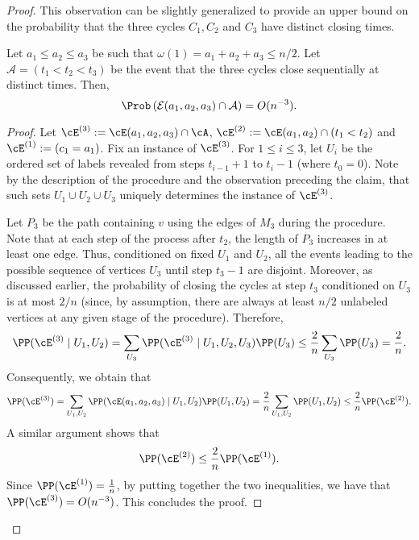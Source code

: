 \documentclass{article}
\begin{document}
\begin{proof}
This observation can be slightly generalized to provide an upper bound on the probability that the three cycles $C_1,C_2$ and $C_3$ have distinct closing times.

\begin{claim}\label{clm:difclosing}
   Let $a_1\leq a_2\leq a_3$ be such that $\omega(1)=a_1+a_2+a_3\leq n/2$. Let $\mathcal A=(t_1 <t_2<t_3)$ be the event that the three cycles close sequentially at distinct times. Then,
   $$\Prob\left(\mathcal E(a_1,a_2,a_3)\cap \mathcal A\right)=O(n^{-3}).$$
\end{claim}

\begin{proof}
Let $\cE^{(3)}:=\cE(a_1,a_2,a_3)\cap \cA$, $\cE^{(2)}:=\cE(a_1,a_2)\cap (t_1<t_2)$ and $\cE^{(1)}:=(c_1=a_1)$. Fix an instance of $\cE^{(3)}$. For $1\leq i\leq 3$, let $U_i$ be the ordered set of labels revealed from steps $t_{i-1}+1$ to $t_i-1$ (where $t_0=0$). Note by the description of the procedure and the observation preceding the claim, that such sets $U_1\cup U_2\cup U_3$ uniquely determines the instance of $\cE^{(3)}$.

Let $P_3$ be the path containing $v$ using the edges of $M_3$ during the procedure. Note that at each step of the process after $t_{2}$, the length of $P_3$ increases in at least one edge. Thus, conditioned on fixed $U_1$ and $U_2$, all the events leading to the possible sequence of vertices $U_{3}$ until step $t_{3}-1$ are disjoint. Moreover, as discussed earlier, the probability of closing the cycles at step $t_3$ conditioned on $U_3$ is at most $2/n$ (since, by assumption, there are always at least $n/2$ unlabeled vertices at any given stage of the procedure). Therefore, 
\begin{align*}
    \PP(\cE^{(3)}\mid U_1,U_2)=\sum_{U_3}\PP(\cE^{(3)}\mid U_1,U_2,U_3)\PP(U_3)\leq\frac{2}{n}\sum_{U_3}\PP(U_3)=\frac{2}{n}.
\end{align*}
Consequently, we obtain that
\begin{align*}
    \PP(\cE^{(3)})=\sum_{U_1,U_2}\PP(\cE(a_1,a_2,a_3)\mid U_1,U_2)\PP(U_1, U_2)=\frac{2}{n}\sum_{U_1,U_2}\PP(U_1, U_2)\leq\frac{2}{n}\PP(\cE^{(2)}).
\end{align*}
A similar argument shows that
\begin{align*}
    \PP(\cE^{(2)})\leq \frac{2}{n}\PP(\cE^{(1)}).
\end{align*}
Since $\PP(\cE^{(1)})=\frac{1}{n}$, by putting together the two inequalities, we have that $\PP(\cE^{(3)})=O(n^{-3})$. This concludes the proof.
\end{proof}


\end{proof}
\end{document}
